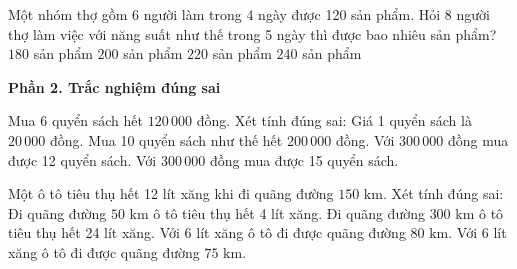 \begin{ex} %
Một nhóm thợ gồm 6 người làm trong 4 ngày được 120 sản phẩm. Hỏi 8 người thợ làm việc với năng suất như thế trong 5 ngày thì được bao nhiêu sản phẩm?
\choice
{$180$ sản phẩm}
{\True $200$ sản phẩm}
{$220$ sản phẩm}
{$240$ sản phẩm}
\end{ex}

\textbf{Phần 2. Trắc nghiệm đúng sai}

\begin{ex} %
Mua 6 quyển sách hết $120\,000$ đồng. Xét tính đúng sai:
\choiceTF
{\True Giá 1 quyển sách là $20\,000$ đồng.}
{\True Mua 10 quyển sách như thế hết $200\,000$ đồng.}
{Với $300\,000$ đồng mua được 12 quyển sách.}
{\True Với $300\,000$ đồng mua được 15 quyển sách.}
\end{ex}

\begin{ex} %
Một ô tô tiêu thụ hết 12 lít xăng khi đi quãng đường $150\text{ km}$. Xét tính đúng sai:
\choiceTF
{\True Đi quãng đường $50\text{ km}$ ô tô tiêu thụ hết 4 lít xăng.}
{\True Đi quãng đường $300\text{ km}$ ô tô tiêu thụ hết 24 lít xăng.}
{Với 6 lít xăng ô tô đi được quãng đường $80\text{ km}$.}
{\True Với 6 lít xăng ô tô đi được quãng đường $75\text{ km}$.}
\end{ex}


